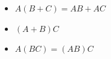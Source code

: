\documentclass[10pt,]{krantz}
\providecommand{\tightlist}{%
  \setlength{\itemsep}{0pt}\setlength{\parskip}{0pt}}
\theoremstyle{definition}
\theoremstyle{definition}
\theoremstyle{definition}
\theoremstyle{definition}
\theoremstyle{remark}
\begin{document}
\begin{itemize}
\tightlist
\item
  \(A(B+C)=AB+AC\)
\item
  \((A+B)C\)
\item
  \(A(BC)=(AB)C\)
\end{itemize}



\printindex
\end{document}

